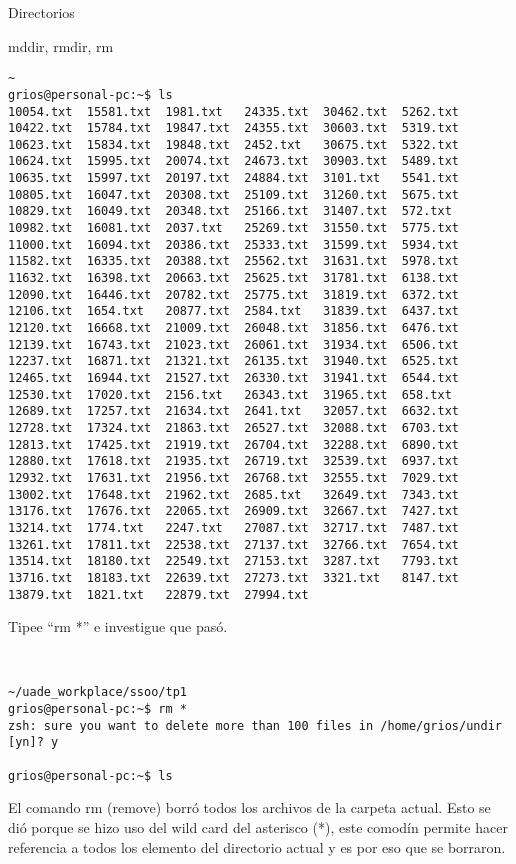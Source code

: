 \begin{section}{Directorios}
\begin{subsection}{mddir, rmdir, rm}
\begin{lstlisting}[style=Ubuntu]
~
grios@personal-pc:~$ ls
10054.txt  15581.txt  1981.txt   24335.txt  30462.txt  5262.txt
10422.txt  15784.txt  19847.txt  24355.txt  30603.txt  5319.txt
10623.txt  15834.txt  19848.txt  2452.txt   30675.txt  5322.txt
10624.txt  15995.txt  20074.txt  24673.txt  30903.txt  5489.txt
10635.txt  15997.txt  20197.txt  24884.txt  3101.txt   5541.txt
10805.txt  16047.txt  20308.txt  25109.txt  31260.txt  5675.txt
10829.txt  16049.txt  20348.txt  25166.txt  31407.txt  572.txt
10982.txt  16081.txt  2037.txt   25269.txt  31550.txt  5775.txt
11000.txt  16094.txt  20386.txt  25333.txt  31599.txt  5934.txt
11582.txt  16335.txt  20388.txt  25562.txt  31631.txt  5978.txt
11632.txt  16398.txt  20663.txt  25625.txt  31781.txt  6138.txt
12090.txt  16446.txt  20782.txt  25775.txt  31819.txt  6372.txt
12106.txt  1654.txt   20877.txt  2584.txt   31839.txt  6437.txt
12120.txt  16668.txt  21009.txt  26048.txt  31856.txt  6476.txt
12139.txt  16743.txt  21023.txt  26061.txt  31934.txt  6506.txt
12237.txt  16871.txt  21321.txt  26135.txt  31940.txt  6525.txt
12465.txt  16944.txt  21527.txt  26330.txt  31941.txt  6544.txt
12530.txt  17020.txt  2156.txt   26343.txt  31965.txt  658.txt
12689.txt  17257.txt  21634.txt  2641.txt   32057.txt  6632.txt
12728.txt  17324.txt  21863.txt  26527.txt  32088.txt  6703.txt
12813.txt  17425.txt  21919.txt  26704.txt  32288.txt  6890.txt
12880.txt  17618.txt  21935.txt  26719.txt  32539.txt  6937.txt
12932.txt  17631.txt  21956.txt  26768.txt  32555.txt  7029.txt
13002.txt  17648.txt  21962.txt  2685.txt   32649.txt  7343.txt
13176.txt  17676.txt  22065.txt  26909.txt  32667.txt  7427.txt
13214.txt  1774.txt   2247.txt   27087.txt  32717.txt  7487.txt
13261.txt  17811.txt  22538.txt  27137.txt  32766.txt  7654.txt
13514.txt  18180.txt  22549.txt  27153.txt  3287.txt   7793.txt
13716.txt  18183.txt  22639.txt  27273.txt  3321.txt   8147.txt
13879.txt  1821.txt   22879.txt  27994.txt  
\end{lstlisting}


\begin{quoting}
Tipee “rm *” e investigue que pasó.
\end{quoting}\\

\begin{lstlisting}[style=Ubuntu]
~/uade_workplace/ssoo/tp1
grios@personal-pc:~$ rm *
zsh: sure you want to delete more than 100 files in /home/grios/undir [yn]? y

grios@personal-pc:~$ ls

\end{lstlisting}

El comando rm (remove) borró todos los archivos de la carpeta actual. Esto se dió porque se hizo uso del wild card del asterisco (*), este comodín permite hacer referencia a todos los elemento del directorio actual y es por eso que se borraron.

\end{subsection}

\end{section}